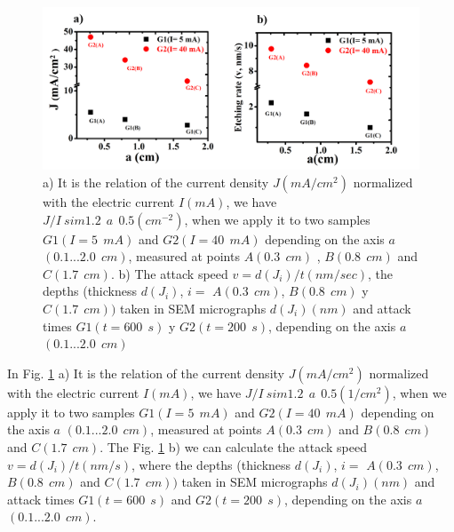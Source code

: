 \documentclass{article}
\begin{document}
 \begin{figure}
   \centering
   \includegraphics[width=\textwidth]{Images/grinJDR}
   \caption{a) It is the relation of the current density $
       J (mA / cm ^ 2) $ normalized with the electric current $ I
       (mA) $, we have $ J / I \ sim 1.2 \ \ a \ \ 0.5 ( cm^{-2})
       $, when we apply it to two samples $ G1 (I = 5 \ \ mA) $
       and $ G2 (I = 40 \ \ mA) $ depending on the axis $ a $ $
       (0.1 ... 2.0 \ \ cm) $, measured at points $ A (0.3 \ \
       cm) $ , $ B (0.8 \ \ cm) $ and $ C (1.7 \ \ cm) $. b) The
       attack speed $ v = d (J_i) / t (nm / sec) $, the depths
       (thickness $ d (J_i) $, $ i = $ $ A (0.3 \ \ cm) $, $ B (
       0.8 \ \ cm) $ y $ C (1.7 \ \ cm)) $ taken in SEM
       micrographs $ d (J_i) (nm) $ and attack times $ G1 (t =
       600 \ \ s) $ y $ G2 (t = 200 \ \ s) $, depending on the
       axis $ a $ $ (0.1 ... 2.0 \ \ cm) $ }
   \label{fig:JDR}
 \end{figure}
In Fig. \ref{fig:JDR} a) It is the relation of the current density $ J
(mA / cm ^ 2) $ normalized with the electric current $ I (mA) $, we
have $ J / I \ sim 1.2 \ \ a \ \ 0.5 (1 / cm ^ 2) $, when we apply it
to two samples $ G1 (I = 5 \ \ mA) $ and $ G2 (I = 40 \ \ mA) $
depending on the axis $ a $ $ (0.1 ... 2.0 \ \ cm) $, measured at
points $ A (0.3 \ \ cm) $ and $ B (0.8 \ \ cm) $ and $ C (1.7 \ \ cm)
$.
The Fig. \ref{fig:JDR} b) we can calculate the attack speed $ v = d
(J_i) / t (nm / s) $, where the depths (thickness $ d (J_i) $, $ i = $
$ A (0.3 \ \ cm) $, $ B (0.8 \ \ cm) $ and $ C (1.7 \ \ cm)) $ taken
in SEM micrographs $ d (J_i) (nm) $ and attack times $ G1 (t = 600 \ \
s) $ and $ G2 (t = 200 \ \ s) $, depending on the axis $ a $ $ (0.1
... 2.0 \ \ cm) $.
\end{document}
